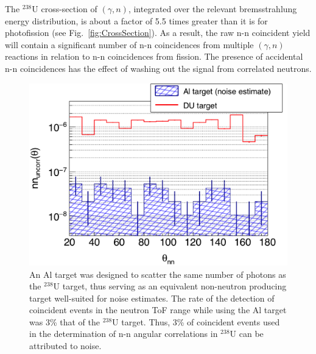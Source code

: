The $^{238}$U cross-section of $(\gamma, n)$, integrated over the relevant bremsstrahlung energy distribution, is about a factor of 5.5 times greater than it is for photofission (see Fig.~\ref{fig:CrossSection}).
As a result, the raw n-n coincident yield will contain a significant number of n-n coincidences from multiple $(\gamma, n)$ reactions in relation to n-n coincidences from fission.
The presence of accidental n-n coincidences has the effect of washing out the signal from correlated neutrons. 
\begin{figure}[]
\centering
    \includegraphics[width=\figsize\textwidth]{Noise.png}
    \caption{An Al target was designed to scatter the same number of photons as the $^{238}$U target, thus serving as an equivalent non-neutron producing target well-suited for noise estimates.
    The rate of the detection of coincident events in the neutron ToF range while using the Al target was 3\% that of the $^{238}$U target.
    Thus, 3\% of coincident events used in the determination of n-n angular correlations in $^{238}$U can be attributed to noise.
        }
    \label{fig:Noise}
\end{figure}
